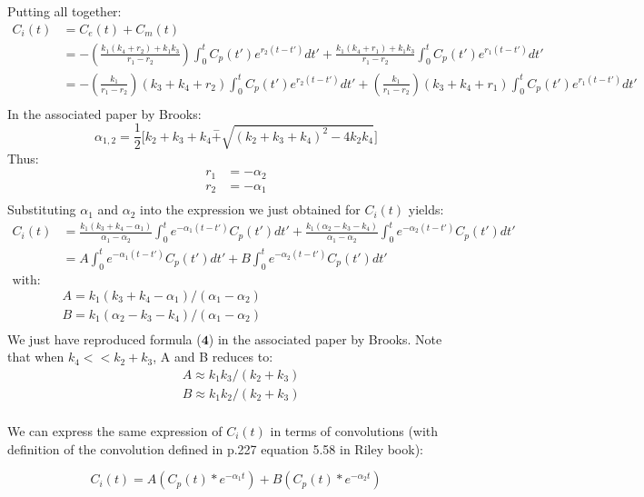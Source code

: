 \documentclass[12pt,twoside]{article}
\begin{document}
Putting all together:
\begin{align*}
	C_i(t)	&= C_e(t) + C_m(t) \\
			&= - ( \frac{ k_1 (k_4 + r_2)  + k_1 k_3  } { r_1 - r_2 } )  \int_0^t  C_p(t')  e^{r_2 (t-t')} dt'  + 
			\frac{ k_1 (k_4 + r_1)  + k_1 k_3  } { r_1 - r_2 } \int_0^t  C_p(t')  e^{r_1 (t-t')} dt' \\
			&= - (\frac{ k_1 } { r_1 - r_2 }) (k_3 + k_4 + r_2)  \int_0^t  C_p(t')  e^{r_2 (t-t')} dt'  + 
			 (\frac{ k_1 } { r_1 - r_2 }) (k_3 + k_4 + r_1)  \int_0^t  C_p(t')  e^{r_1 (t-t')} dt' \\
\end{align*}
 In the associated paper by Brooks:
\begin{equation*}
	\alpha_{1,2} = \frac{1}{2} \bigg [ k_2 + k_3 + k_4 \stackrel{-}{+} \sqrt{ (k_2 + k_3 + k_4)^2 - 4 k_2 k_4} \bigg ]
\end{equation*}
Thus:
\begin{align*}
	r_1 &= - \alpha_2  \\
	r_2 &= - \alpha_1 \\
\end{align*}
Substituting $\alpha_1$ and $\alpha_2$ into the expression we just obtained for $C_i(t)$ yields:
\begin{align*}
C_i(t)	&= \frac{ k_1 (k_3 + k_4 - \alpha_1) } { \alpha_1 - \alpha_2 }  \int_0^t e^{-\alpha_1 (t-t')}  C_p(t')   dt'  + 
		\frac{ k_1  ( \alpha_2 - k_3 - k_4) } { \alpha_1 - \alpha_2 }  \int_0^t e^{-\alpha_2 (t-t')}  C_p(t')   dt'  \\
		&= A  \int_0^t e^{-\alpha_1 (t-t')}  C_p(t')   dt'  + B \int_0^t e^{-\alpha_2 (t-t')}  C_p(t')   dt'  \\
		\text{with:} \\
&		A =  k_1 (k_3 + k_4 - \alpha_1) / (\alpha_1 - \alpha_2 )\\
&		B =  k_1 ( \alpha_2 - k_3 - k_4) / (\alpha_1 - \alpha_2) \\
\end{align*}
 We just have reproduced formula ($\textbf{4}$) in the associated paper by Brooks. Note that when $k_4 << k_2+k_3$, A and B reduces to:
\begin{align*}
& A \approx k_1 k_3 / (k_2 + k_3) \\
& B \approx k_1 k_2 / (k_2 + k_3) \\
\end{align*}

We can express the same expression of $C_i(t)$ in terms of convolutions (with definition of the convolution defined in p.227 equation 5.58 in Riley book):

\begin{equation*}
	C_i (t) = A (C_p(t) * e^{-\alpha_1 t}) + B  (C_p(t) * e^{-\alpha_2 t}) 
\end{equation*}
\end{document}
